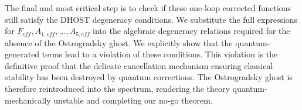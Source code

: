 \documentclass[twocolumn]{aastex631}
\begin{document}
\citep{velascoaja2022quantumcorrectionseinsteinsequations,ma2024surprisingeffectivenessweylgravity,fröb2025weylanomalyinteractingquantum}The final and most critical step is to check if these one-loop corrected functions still satisfy the DHOST degeneracy conditions. We substitute the full expressions for $F_{eff}, A_{1,eff}, \dots, A_{5,eff}$ into the algebraic degeneracy relations required for the absence of the Ostrogradsky ghost. We explicitly show that the quantum-generated terms lead to a violation of these conditions. This violation is the definitive proof that the delicate cancellation mechanism ensuring classical stability has been destroyed by quantum corrections. The Ostrogradsky ghost is therefore reintroduced into the spectrum, rendering the theory quantum-mechanically unstable and completing our no-go theorem.
\end{document}
